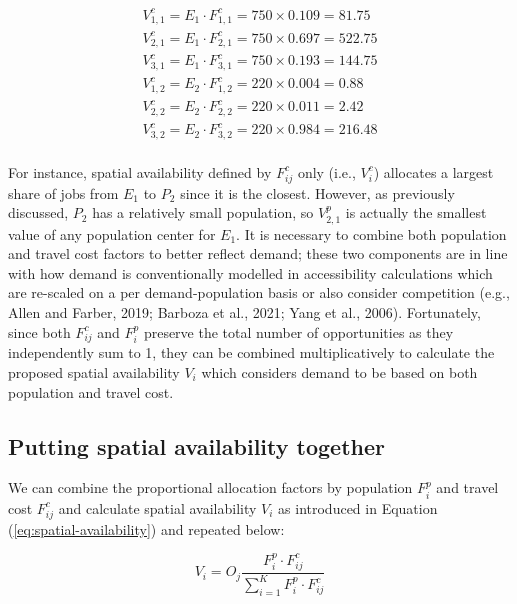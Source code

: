 \documentclass[]{elsarticle} %
\begin{document}
\begin{equation}
\label{eq:tcost-allocation-factor-SA-2populations}
\begin{array}{l}
V^c_{1,1} = E_1 \cdot F^c_{1,1} = 750 \times 0.109 = 81.75\\
V^c_{2,1} = E_1 \cdot F^c_{2,1} = 750 \times  0.697 = 522.75\\
V^c_{3,1} = E_1 \cdot F^c_{3,1} = 750 \times  0.193 = 144.75\\
V^c_{1,2} = E_2 \cdot F^c_{1,2} = 220 \times 0.004 = 0.88\\
V^c_{2,2} = E_2 \cdot F^c_{2,2} = 220 \times  0.011 = 2.42\\
V^c_{3,2} = E_2 \cdot F^c_{3,2} = 220 \times  0.984 = 216.48\\
\end{array}
\end{equation}

For instance, spatial availability defined by \(F^c_{ij}\) only (i.e.,
\(V^c_{i}\)) allocates a largest share of jobs from \(E_1\) to \(P_2\)
since it is the closest. However, as previously discussed, \(P_2\) has a
relatively small population, so \(V^p_{2,1}\) is actually the smallest
value of any population center for \(E_1\). It is necessary to combine
both population and travel cost factors to better reflect demand; these
two components are in line with how demand is conventionally modelled in
accessibility calculations which are re-scaled on a per
demand-population basis or also consider competition (e.g., Allen and
Farber, 2019; Barboza et al., 2021; Yang et al., 2006). Fortunately,
since both \(F^c_{ij}\) and \(F^p_{i}\) preserve the total number of
opportunities as they independently sum to 1, they can be combined
multiplicatively to calculate the proposed spatial availability
\(V_{i}\) which considers demand to be based on both population and
travel cost.

\hypertarget{putting-spatial-availability-together}{%
\subsection{Putting spatial availability
together}\label{putting-spatial-availability-together}}

We can combine the proportional allocation factors by population
\(F^p_{i}\) and travel cost \(F^c_{ij}\) and calculate spatial
availability \(V_{i}\) as introduced in Equation
(\ref{eq:spatial-availability}) and repeated below:

\[
V_{i} = O_j\frac{F^p_{i} \cdot F^c_{ij}}{\sum_{i=1}^K F^p_{i} \cdot F^c_{ij}}
\]
\end{document}
